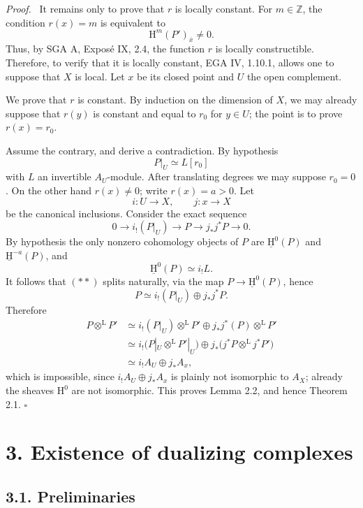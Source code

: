 \documentclass[11pt]{article}
\providecommand{\Hh}{\mathrm{H}}
\providecommand{\uH}{\underline{\mathrm H}}
\providecommand{\qedtext}{\hfill$\square$}
\providecommand{\ZZ}{\mathbb{Z}}
\newenvironment{prooftext}[1][Proof]{\par\noindent\emph{#1.}\ }{\par\medskip}
\newcommand{\ol}[1]{\overline{#1}}
\providecommand{\qedtext}{\hfill$\square$}
\begin{document}
\begin{prooftext}
It remains only to prove that $r$ is locally constant. For $m\in\ZZ$, the condition $r(x)=m$ is equivalent to
\[
   \Hh^m(P')_{\ol{x}}\ne0.
\]
Thus, by SGA A, Exposé IX, 2.4, the function $r$ is locally constructible. Therefore, to verify that it is locally constant, EGA IV, 1.10.1, allows one to suppose that $X$ is local. Let $x$ be its closed point and $U$ the open complement.

We prove that $r$ is constant. By induction on the dimension of $X$, we may already suppose that $r(y)$ is constant and equal to $r_0$ for $y\in U$; the point is to prove $r(x)=r_0$.

Assume the contrary, and derive a contradiction. By hypothesis
\[
   P|_U\simeq L[r_0]
\]
with $L$ an invertible $A_U$-module. After translating degrees we may suppose $r_0=0$. On the other hand $r(x)\ne0$; write $r(x)=a>0$. Let
\[
   i:U\to X,
   \qquad
   j:x\to X
\]
be the canonical inclusions. Consider the exact sequence
\begin{equation}
0\longrightarrow i_!(P|_U)\longrightarrow P\longrightarrow j_*j^*P\longrightarrow0.\tag{**}
\end{equation}
By hypothesis the only nonzero cohomology objects of $P$ are $\uH^0(P)$ and $\uH^{-a}(P)$, and
\[
   \uH^0(P)\simeq i_!L.
\]
It follows that $(**)$ splits naturally, via the map $P\to\uH^0(P)$, hence
\[
   P\simeq i_!(P|_U)\oplus j_*j^*P.
\]
Therefore
\begin{align*}
P\otimes^{\mathrm L}P'
&\simeq i_!(P|_U)\otimes^{\mathrm L}P'
      \oplus j_*j^*(P)\otimes^{\mathrm L}P' \\
&\simeq i_!\bigl(P|_U\otimes^{\mathrm L}P'|_U\bigr)
      \oplus j_*\bigl(j^*P\otimes^{\mathrm L}j^*P'\bigr)\\
&\simeq i_!A_U\oplus j_*A_x,
\end{align*}
which is impossible, since $i_!A_U\oplus j_*A_x$ is plainly not isomorphic to $A_X$; already the sheaves $\Hh^0$ are not isomorphic. This proves Lemma 2.2, and hence Theorem 2.1. \qedtext
\end{prooftext}

\section*{3. Existence of dualizing complexes}

\subsection*{3.1. Preliminaries}
\end{document}

